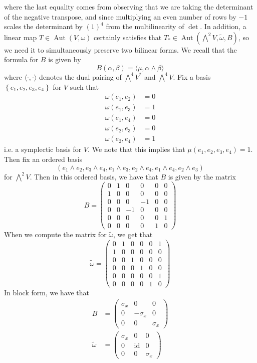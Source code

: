\documentclass[psamsfonts]{amsart}
\theoremstyle{definition}
\theoremstyle{remark}
\newcommand{\set}[1]{\left\lbrace #1 \right\rbrace}
\DeclareMathOperator{\id}{id}
\DeclareMathOperator{\Aut}{Aut}
\begin{document}
where the last equality comes from observing that we are taking the determinant of the negative transpose, and since multiplying an even number of rows by $-1$ scales the determinant by $(1)^4$ from the multilinearity of $\det$. In addition, a linear map $T \in \Aut(V,\omega)$ certainly satisfies that $T_* \in \Aut(\bigwedge^2V, \tilde{\omega}, B)$, so we need it to simultaneously preserve two bilinear forms. We recall that the formula for $B$ is given by
$$B(\alpha, \beta) = \langle \mu, \alpha \wedge \beta  \rangle $$
where $\langle \cdot,\cdot \rangle$ denotes the dual pairing of $\bigwedge^4 V^*$ and $\bigwedge^4V$. Fix a basis $\set{e_1, e_2, e_3, e_4}$ for $V$ such that 
\begin{align*}
\omega(e_1,e_2) &= 0 \\
\omega(e_1, e_3) &= 1 \\
\omega (e_1, e_4) &= 0 \\
\omega(e_2, e_3) &= 0 \\
\omega(e_2, e_4) &= 1
\end{align*}
i.e. a symplectic basis for $V$. We note that this implies that $\mu(e_1, e_2, e_3, e_4) = 1$. Then fix an ordered basis
$$(e_1 \wedge e_2, e_3 \wedge e_4, e_1 \wedge e_3, e_2 \wedge e_4, e_1 \wedge e_4, e_2 \wedge e_3) $$
for $\bigwedge^2V$. Then in this ordered basis, we have that $B$ is given by the matrix
$$B = \begin{pmatrix}
0 & 1 & 0 & 0 & 0 & 0 \\
1 & 0 & 0 & 0 & 0 & 0 \\
0 & 0 & 0 & -1 & 0 & 0 \\
0 & 0 & -1 & 0 & 0 & 0 \\
0 & 0 & 0 & 0 & 0 & 1 \\
0 & 0 & 0 & 0 & 1 & 0
\end{pmatrix} $$
When we compute the matrix for $\tilde{\omega}$, we get that 
$$\tilde{\omega} = \begin{pmatrix}
0 & 1 & 0 & 0 & 0 & 1 \\
1 & 0 & 0 & 0 & 0 & 0  \\
0 & 0 & 1 & 0 & 0 & 0 \\
0 & 0 & 0 & 1 & 0 & 0 \\
0 & 0 & 0 & 0 & 0 & 1 \\
0 & 0 & 0 & 0 & 1 & 0
\end{pmatrix} $$
In block form, we have that 
\begin{align*}
B &= \begin{pmatrix}
\sigma_x & 0 & 0 \\
0 & -\sigma_x & 0 \\
0 & 0 & \sigma_x
\end{pmatrix} \\[5pt]
\tilde{\omega} &= \begin{pmatrix}
\sigma_x & 0 & 0 \\
0 & \id & 0 \\
0 & 0 & \sigma_x
\end{pmatrix}
\end{align*}
\end{document}
